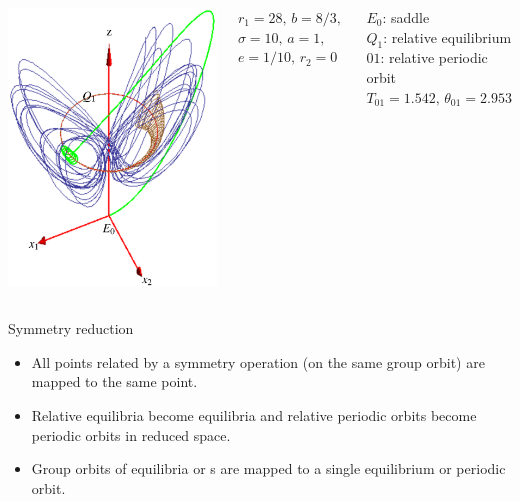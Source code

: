 \documentclass{beamer}
\begin{document}
\begin{frame}
  \begin{columns}[t]
	\begin{block}{}
	\begin{center}
		\includegraphics[width=.7\textwidth]{../../figs/CLE.eps}
	\end{center}
	\end{block}
	\begin{block}{ }
	 ${r_1=28,}\, {b=8/3,}\,$ ${\sigma=10,}\, {a=1,}\,$ ${e=1/10,}\, {r_2=0}$
	\end{block}
	\begin{block}{ }
	  $E_0$: saddle\\
	  $Q_1$: relative equilibrium\\ 
	  $01$:  relative periodic orbit $T_{01}=1.542,\, \theta_{01}=2.953$
	\end{block}
   \end{columns}
\end{frame}

\begin{frame}{Symmetry reduction}
\begin{itemize}
 \item All points related by a symmetry operation (on the same group orbit) are mapped to the same point.
 \item Relative equilibria become equilibria and relative periodic orbits become periodic orbits in reduced space.
 \item Group orbits of equilibria or {\po s} are mapped to a single equilibrium or periodic orbit.
\end{itemize}
\end{frame}
\end{document}
